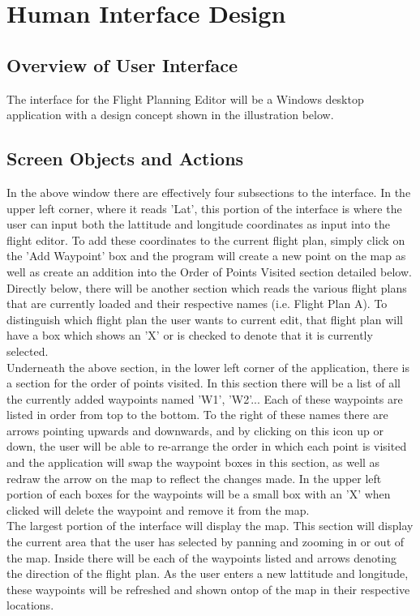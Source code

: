 \documentclass[12pt, letterpaper]{article}
\begin{document}
\newpage
\section{Human Interface Design} \label{sec:ui}
\subsection{Overview of User Interface}
The interface for the Flight Planning Editor will be a Windows desktop application with a design concept shown in the illustration below.

\subsection{Screen Objects and Actions}
In the above window there are effectively four subsections to the interface. In the upper left corner, where it reads 'Lat', this portion of the interface is where the user can input both the lattitude and longitude coordinates as input into the flight editor. To add these coordinates to the current flight plan, simply click on the 'Add Waypoint' box and the program will create a new point on the map as well as create an addition into the Order of Points Visited section detailed below. \\
Directly below, there will be another section which reads the various flight plans that are currently loaded and their respective names (i.e. Flight Plan A). To distinguish which flight plan the user wants to current edit, that flight plan will have a box which shows an 'X' or is checked to denote that it is currently selected. \\
Underneath the above section, in the lower left corner of the application, there is a section for the order of points visited. In this section there will be a list of all the currently added waypoints named 'W1', 'W2'... Each of these waypoints are listed in order from top to the bottom. To the right of these names there are arrows pointing upwards and downwards, and by clicking on this icon up or down, the user will be able to re-arrange the order in which each point is visited and the application will swap the waypoint boxes in this section, as well as redraw the arrow on the map to reflect the changes made. In the upper left portion of each boxes for the waypoints will be a small box with an 'X' when clicked will delete the waypoint and remove it from the map.\\
The largest portion of the interface will display the map. This section will display the current area that the user has selected by panning and zooming in or out of the map. Inside there will be each of the waypoints listed and arrows denoting the direction of the flight plan. As the user enters a new lattitude and longitude, these waypoints will be refreshed and shown ontop of the map in their respective locations. \\
\end{document}
